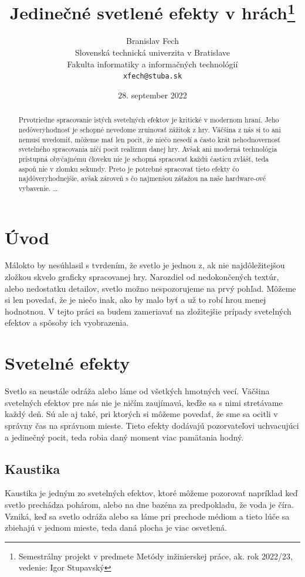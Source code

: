 \documentclass[10pt,twoside,slovak,a4paper]{article}
\title{Jedinečné svetlené efekty v hrách\thanks{Semestrálny projekt v predmete Metódy inžinierskej práce, ak. rok 2022/23, vedenie: Igor Stupavský}} %
\author{Branislav Fech\\[2pt]
	{\small Slovenská technická univerzita v Bratislave}\\
	{\small Fakulta informatiky a informačných technológií}\\
	{\small \texttt{xfech@stuba.sk}}
	}
\date{\small 28. september 2022} %
\begin{document}
\maketitle

\begin{abstract}
Prvotriedne spracovanie istých svetelných efektov je kritické v modernom hraní. 
Jeho nedôveryhodnosť je schopné nevedome zruinovať zážitok z hry. Väčšina z nás 
si to ani nemusí uvedomiť, môžeme mať len pocit, že niečo nesedí a často krát 
nehodnovernosť svetelného spracovania ničí pocit realizmu danej hry. Avšak ani 
moderná technológia prístupná obyčajnému človeku nie je schopná spracovať každú 
časticu zvlášť, teda aspoň nie v zlomku sekundy. Preto je potrebné spracovať tieto 
efekty čo najdôveryhodnejšie, avšak zároveň s čo najmenšou záťažou na naše hardware-ové 
vybavenie.
\ldots
\end{abstract}



\section{Úvod}
Málokto by nesúhlasil s tvrdením, že svetlo je jednou z, ak nie najdôležitejšou 
zložkou skvelo graficky spracovanej hry. Narozdiel od nedokončených textúr, alebo 
nedostatku detailov, svetlo možno nespozorujeme na prvý pohľad. Môžeme si len povedať, 
že je niečo inak, ako by malo byť a už to robí hrou menej hodnotnou. V tejto práci sa 
budem zameriavať na zložitejšie prípady svetelných efektov a spôsoby ich vyobrazenia.

\section{Svetelné efekty} \label{se}
Svetlo sa neustále odráža alebo láme od všetkých hmotných vecí. Väčšina svetelných 
efektov pre nás nie je ničím zaujímavá, keďže sa s nimi stretávame každý deň. Sú ale 
aj také, pri ktorých si môžeme povedať, že sme sa ocitli v správny čas na správnom mieste.
Tieto efekty dodávajú  pozorvateľovi uchvacujúci a jedinečný pocit, teda robia daný 
moment viac pamätania hodný.

\subsection{Kaustika} \label{se:kaustika}
Kaustika je jedným zo svetelných efektov, ktoré môžeme pozorovať napríklad keď svetlo 
prechádza pohárom, alebo na dne bazéna za predpokladu, že voda je číra. Vzniká, keď sa 
svetlo odráža alebo sa láme pri prechode médiom a tieto lúče sa zbiehajú v jednom mieste, 
teda daná plocha je viac osvetlená.
\end{document}
